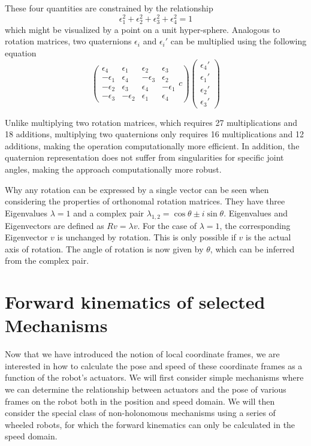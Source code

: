 These four quantities are constrained by the relationship
\begin{equation}
\epsilon_1^2+\epsilon_2^2+\epsilon_3^2+\epsilon_4^2=1
\end{equation}
which might be visualized by a point on a unit hyper-sphere. %
Analogous to rotation matrices, two quaternions $\epsilon_i$ and $\epsilon_i'$ can be multiplied using the following equation
\begin{equation}
\left(
\begin{array}{cccc}
\epsilon_4 & \epsilon_1 & \epsilon_2 & \epsilon_3\\
-\epsilon_1 & \epsilon_4 & -\epsilon_3 & \epsilon_2\\
-\epsilon_2 & \epsilon_3 & \epsilon_4 & -\epsilon_1\\
-\epsilon_3 & -\epsilon_2 & \epsilon_1 & \epsilon_4
\end{array}{c}
\right)
\left(\begin{array}{c}\epsilon_4'\\\epsilon_1'\\\epsilon_2'\\\epsilon_3'\end{array}\right)
\end{equation}

Unlike multiplying two rotation matrices, which requires 27 multiplications and 18 additions, multiplying two quaternions only requires 16 multiplications and 12 additions, making the operation computationally more efficient. In addition, the quaternion representation does not suffer from singularities for specific joint angles, making the approach computationally more robust.

Why any rotation can be expressed by a single vector can be seen when considering the properties of orthonomal rotation matrices. They have three Eigenvalues $\lambda=1$ and a complex pair $\lambda_{1,2}=\cos \theta \pm i \sin \theta$. Eigenvalues and Eigenvectors are defined as $Rv=\lambda v$. For the case of $\lambda=1$, the corresponding Eigenvector $v$ is unchanged by rotation. This is only possible if $v$ is the actual axis of rotation. The angle of rotation is now given by $\theta$, which can be inferred from the complex pair.

\section{Forward kinematics of selected Mechanisms}
Now that we have introduced the notion of local coordinate frames, we are interested in how to calculate the pose and speed of these coordinate frames as a function of the robot's actuators. We will first consider simple mechanisms where we can determine the relationship between actuators and the pose of various frames on the robot both in the position and speed domain. We will then consider the special class of non-holonomous mechanisms using a series of wheeled robots, for which the forward kinematics can only be calculated in the speed domain.

